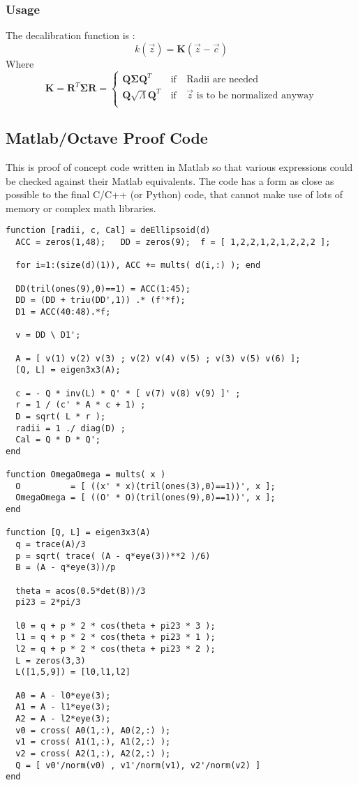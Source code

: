 \documentclass{article}
\def\mat#1{\mathbf{#1}}
\begin{document}
\subsubsection{Usage}
The decalibration function is :
\begin{equation}
k(\vec{z}) = \mat{K}\left( \vec{z} - \vec{c} \right)
\end{equation}
Where
\begin{equation}
\mat{K} 
= \mat{R}^T \mat{\Sigma} \mat{R}
= \left\{\begin{matrix}
\mat{Q} \mat{\Sigma} \mat{Q}^T &~\text{if}~&\text{Radii are needed} \\
\mat{Q} \sqrt{\Lambda} \mat{Q}^T &~\text{if}~&\vec{z}\text{ is to be normalized anyway}\\
\end{matrix}
\right.
\end{equation}
\subsection{Matlab/Octave Proof Code}
This is proof of concept code written in Matlab so that various
expressions could be checked against their Matlab equivalents. The
code has a form as close as possible to the final C/C++ (or Python)
code, that cannot make use of lots of memory or complex math
libraries.
\begin{verbatim}
function [radii, c, Cal] = deEllipsoid(d)
  ACC = zeros(1,48);   DD = zeros(9);  f = [ 1,2,2,1,2,1,2,2,2 ];

  for i=1:(size(d)(1)), ACC += mults( d(i,:) ); end

  DD(tril(ones(9),0)==1) = ACC(1:45);
  DD = (DD + triu(DD',1)) .* (f'*f);
  D1 = ACC(40:48).*f;

  v = DD \ D1';

  A = [ v(1) v(2) v(3) ; v(2) v(4) v(5) ; v(3) v(5) v(6) ];
  [Q, L] = eigen3x3(A);

  c = - Q * inv(L) * Q' * [ v(7) v(8) v(9) ]' ;
  r = 1 / (c' * A * c + 1) ;
  D = sqrt( L * r );
  radii = 1 ./ diag(D) ;
  Cal = Q * D * Q';
end

function OmegaOmega = mults( x )
  O          = [ ((x' * x)(tril(ones(3),0)==1))', x ];
  OmegaOmega = [ ((O' * O)(tril(ones(9),0)==1))', x ];
end

function [Q, L] = eigen3x3(A)
  q = trace(A)/3
  p = sqrt( trace( (A - q*eye(3))**2 )/6)
  B = (A - q*eye(3))/p

  theta = acos(0.5*det(B))/3
  pi23 = 2*pi/3

  l0 = q + p * 2 * cos(theta + pi23 * 3 );
  l1 = q + p * 2 * cos(theta + pi23 * 1 );
  l2 = q + p * 2 * cos(theta + pi23 * 2 );
  L = zeros(3,3)
  L([1,5,9]) = [l0,l1,l2]

  A0 = A - l0*eye(3);
  A1 = A - l1*eye(3);
  A2 = A - l2*eye(3);
  v0 = cross( A0(1,:), A0(2,:) );
  v1 = cross( A1(1,:), A1(2,:) );
  v2 = cross( A2(1,:), A2(2,:) );
  Q = [ v0'/norm(v0) , v1'/norm(v1), v2'/norm(v2) ]
end 
\end{verbatim}
\end{document}
